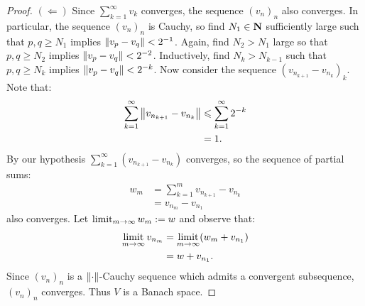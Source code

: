 \documentclass[11pt,twoside,openany]{memoir}
\begin{document}
\begin{proof}
            $(\Leftarrow)$ Since $\sum_{k = 1}^\infty v_k$ converges, the sequence $(v_n)_n$ also converges. In particular, the sequence $(v_n)_n$ is Cauchy, so find $N_1 \in \mathbf{N}$ sufficiently large such that $p,q \geq N_1$ implies $\left\lVert v_p - v_q \right\rVert < 2^{-1}$. Again, find $N_2>N_1$ large so that $p,q \geq N_2$ implies $\left\lVert v_p - v_q \right\rVert < 2^{-2}$. Inductively, find $N_k > N_{k-1}$ such that $p,q \geq N_k$ implies $\left\lVert v_p - v_q \right\rVert < 2^{-k}$. Now consider the sequence $(v_{n_{k+1}} - v_{n_k})_k$. Note that:
                \begin{equation*}
                \begin{split}
                    \sum_{k = 1}^\infty \left\lVert v_{n_{k+1}} - v_{n_k} \right\rVert
                    & \leqslant \sum_{k = 1}^\infty 2^{-k} \\
                    & = 1.
                \end{split}
                \end{equation*}
            By our hypothesis $\sum_{k = 1}^\infty (v_{n_{k+1}} - v_{n_k})$ converges, so the sequence of partial sums:
                \begin{equation*}
                \begin{split}
                    w_m &
                    = \sum_{k = 1}^m v_{n_{k+1}} - v_{n_k} \\
                    & = v_{n_m} - v_{n_1}
                \end{split}
                \end{equation*}
            also converges. Let $\operatorname*{limit}_{m \rightarrow \infty}w_m := w$ and observe that:
                \begin{equation*}
                \begin{split}
                    \operatorname*{limit}_{m \rightarrow \infty}v_{n_m}
                    & = \operatorname*{limit}_{m \rightarrow \infty}(w_m + v_{n_1}) \\
                    & = w + v_{n_1}.
                \end{split}
                \end{equation*}
            Since $(v_n)_n$ is a $\left\lVert \cdot \right\rVert$-Cauchy sequence which admits a convergent subsequence, $(v_n)_n$ converges. Thus $V$ is a Banach space.
        \end{proof}
\end{document}
